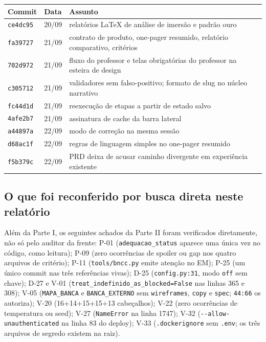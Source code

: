 \documentclass[11pt,a4paper]{article}
\begin{document}
\begin{center}\small
\begin{tabular}{@{}l l p{10.6cm}@{}}
\toprule
\textbf{Commit} & \textbf{Data} & \textbf{Assunto} \\
\midrule
\texttt{ce4dc95} & 20/09 & relatórios LaTeX de análise de imersão e padrão ouro \\
\texttt{fa39727} & 21/09 & contrato de produto, one-pager resumido, relatório comparativo, critérios \\
\texttt{702d972} & 21/09 & fluxo do professor e telas obrigatórias do professor na esteira de design \\
\texttt{c305712} & 21/09 & validadores sem falso-positivo; formato de slug no núcleo narrativo \\
\texttt{fc44d1d} & 21/09 & reexecução de etapas a partir de estado salvo \\
\texttt{4afe2b7} & 21/09 & assinatura de cache da barra lateral \\
\texttt{a44897a} & 22/09 & modo de correção na mesma sessão \\
\texttt{d68ac1f} & 22/09 & regras de linguagem simples no one-pager resumido \\
\texttt{f5b379c} & 22/09 & PRD deixa de acusar caminho divergente em experiência existente \\
\bottomrule
\end{tabular}
\end{center}

\subsection{O que foi reconferido por busca direta neste relatório}

Além da Parte I, os seguintes achados da Parte II foram verificados diretamente, não só pelo
auditor da frente: P-01 (\texttt{adequacao\_status} aparece uma única vez no código, como leitura);
P-09 (zero ocorrências de spoiler ou gap nos quatro arquivos de critério); P-11
(\texttt{tools/bncc.py} emite atenção no EM); P-25 (um único commit nas três referências vivas);
D-25 (\texttt{config.py:31}, modo \texttt{off} sem chave); D-27 e V-01 (\texttt{treat\_indefinido\_as\_blocked=False}
nas linhas 365 e 308); V-05 (\texttt{MAPA\_BANCA} e \texttt{BANCA\_EXTERNO} sem \texttt{wireframes},
\texttt{copy} e \texttt{spec}; \texttt{44:66} os autoriza); V-20 (16+14+15+15+13 cabeçalhos); V-22
(zero ocorrências de temperatura ou seed); V-27 (\texttt{NameError} na linha 1747); V-32
(\texttt{-{}-allow-unauthenticated} na linha 83 do deploy); V-33 (\texttt{.dockerignore} sem
\texttt{.env}; os três arquivos de segredo existem na raiz).
\end{document}
